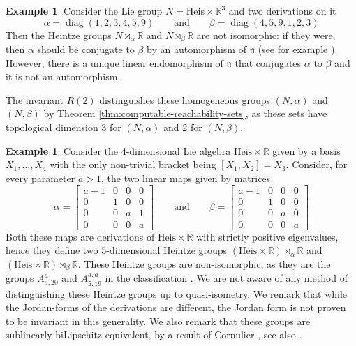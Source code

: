 \documentclass[a4paper,12pt]{amsart}
\newcommand{\pp}{\mathrm}
\newcommand{\puna}[1]{{\color{red}#1}}
\DeclareMathOperator{\diag}{diag}
\newcommand{\matriisi}[2]{\left [\begin{array}{#1} #2 \end{array} \right]}
\theoremstyle{plain}
\theoremstyle{definition}
\newtheorem{Esim}[maar]{Example}
\theoremstyle{plain}
\theoremstyle{remark}
\begin{document}
\begin{Esim} \label{esim:pair-noCPS}
Consider the Lie group \( N = \pp{Heis} \times \mathbb{R}^3 \) and two derivations on it
	\begin{equation*}
	\alpha = \diag(1,2,3,4,5,9) \qquad \text{and} \qquad \beta=\diag(4,5,9,1,2,3)
	\end{equation*}
	Then the Heintze groups \( N \rtimes_\alpha \mathbb{R} \) and \( N \rtimes_\beta \mathbb{R} \) are not isomorphic: if they were, then \( \alpha \) should be conjugate to \( \beta \) by an automorphism of \( \mathfrak{n} \) (see for example \cite[Proposition 4.7]{hakavuori2020gradings}). However, there is a unique linear endomorphism of \( \mathfrak{n} \) that conjugates \( \alpha \) to \( \beta\) and it is not an automorphism. 
	
	The invariant \( R(2) \) distinguishes these homogeneous groups \( (N,\alpha) \) and \( (N,\beta) \) by Theorem \ref{thm:computable-reachability-sets}, as these sets have topological dimension 3 for \( (N,\alpha) \) and  2 for \( (N,\beta) \).
\end{Esim}


\begin{Esim} \label{esim:5D-heintze-sublin}
	Consider the 4-dimensional Lie algebra \( \pp{Heis} \times \mathbb{R} \) given by a basis \( X_1,\ldots,X_4 \) with the only non-trivial bracket being \( [X_1,X_2] = X_3 \). Consider, for every parameter \( a >1 \), the two linear maps given by matrices
	\begin{equation*}
	\alpha = \matriisi{cccc}{a-1 & 0 & 0 & 0 
		\\ 0 & 1 & 0 & 0
		\\ 0 & 0 & a & 1
		\\ 0 & 0 & 0 & a
	}
	\qquad \text{and} \qquad
	\beta=
	\matriisi{cccc}{a-1 & 0 & 0 & 0 
		\\ 0 & 1 & 0 & 0
		\\ 0 & 0 & a & 0
		\\ 0 & 0 & 0 & a
	}
	\end{equation*}
	Both these maps are derivations of \( \pp{Heis} \times \mathbb{R} \) with strictly positive eigenvalues, hence they define two 5-dimensional Heintze groups \(  (\pp{Heis} \times \mathbb{R}) \rtimes_\alpha \mathbb{R} \) and \(  (\pp{Heis} \times \mathbb{R}) \rtimes_\beta \mathbb{R} \). These Heintze groups are non-isomorphic, as they are the groups \( A_{5,20}^a \) and \( A_{5,19}^{a,a} \) in the classification \cite{avain:Patera}.
	We are not aware of any method of distinguishing these Heintze groups up to quasi-isometry. We remark that while the Jordan-forms of the derivations are different, the Jordan form is not proven to be invariant in this generality.
	We also remark that these groups are sublinearly biLipschitz equivalent, by a result of Cornulier \cite[Theorem 1.2]{MR3006687}, see also \cite[Theorem 3.2]{avain:Pal20}.
\end{Esim}
\end{document}
